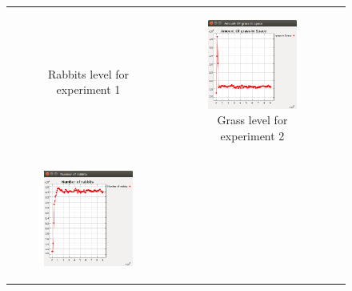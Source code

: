 \documentclass[11pt]{article}
\begin{document}
\begin{figure}
\begin{tabular}{c c c}
\begin{subfigure}[b]{0.3\textwidth}
        \caption{\label{img:rabbits1} Rabbits level for experiment 1}
    \end{subfigure} &
    \begin{subfigure}[b]{0.3\textwidth}
        \includegraphics[width=\textwidth]{experiment/3/Grass.png}
        \caption{\label{img:grass2} Grass level for experiment 2}
    \end{subfigure}\\
    \begin{subfigure}[b]{0.3\textwidth}
        \includegraphics[width=\textwidth]{experiment/3/Rabbits.png}

\end{subfigure}
\end{tabular}
\end{figure}
\end{document}
